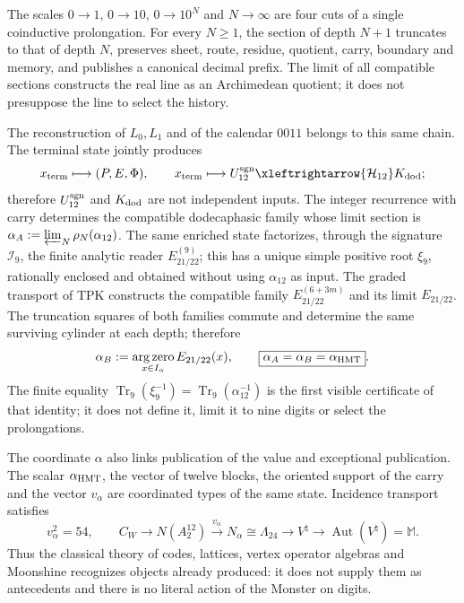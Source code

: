 \begin{theorem}
\label{thm:front-cierre-causal-simultaneo-2084}
The scales \(0\to1\), \(0\to10\), \(0\to10^N\) and
\(N\to\infty\) are four cuts of a single coinductive prolongation.
For every \(N\geq1\), the section of depth \(N+1\) truncates to that of
depth \(N\), preserves sheet, route, residue, quotient, carry, boundary
and memory, and publishes a canonical decimal prefix. The limit of all
compatible sections constructs the real line as an Archimedean quotient;
it does not presuppose the line to select the history.

The reconstruction of \(L_0,L_1\) and of the calendar \(0011\) belongs to
this same chain. The terminal state jointly produces
\[
 x_{\rm term}\longmapsto(P,E,\Phi),
 \qquad
 x_{\rm term}\longmapsto U_{12}^{\rm sgn}
 \xleftrightarrow{\mathcal H_{12}}K_{\rm dod};
\]
therefore \(U_{12}^{\rm sgn}\) and \(K_{\rm dod}\) are not independent
inputs. The integer recurrence with carry determines the compatible
dodecaphasic family whose limit section is
\(\alpha_A:=\varprojlim_N\rho_N(\alpha_{12})\). The same enriched state
factorizes, through the signature \(\mathcal I_9\), the finite analytic reader
\(E_{21/22}^{(9)}\); this has a unique simple positive root \(\xi_9\),
rationally enclosed and obtained without using \(\alpha_{12}\) as input. The
graded transport of TPK constructs the compatible family
\(E_{21/22}^{(6+3m)}\) and its limit \(E_{21/22}\). The truncation squares
of both families commute and determine the same surviving cylinder at each depth;
therefore
\[
 \alpha_B:=\operatorname*{arg\,zero}_{x\in I_\alpha}E_{21/22}(x),
 \qquad
 \boxed{\alpha_A=\alpha_B=\alpha_{\rm HMT}}.
\]
The finite equality
\(\operatorname{Tr}_9(\xi_9^{-1})=
\operatorname{Tr}_9(\alpha_{12}^{-1})\) is the first visible certificate of
that identity; it does not define it, limit it to nine digits or select the
prolongations.

The coordinate \(\alpha\) also links publication of the value and
exceptional publication. The scalar \(\alpha_{\rm HMT}\), the vector of
twelve blocks, the oriented support of the carry and the vector
\(v_\alpha\) are coordinated types of the same state. Incidence
transport satisfies
\[
 v_\alpha^2=54,
 \qquad
 C_W\longrightarrow N(A_2^{12})
 \xrightarrow{\,v_\alpha\,}N_\alpha\cong\Lambda_{24}
 \longrightarrow V^\natural
 \longrightarrow\operatorname{Aut}(V^\natural)=\mathbb M.
\]
Thus the classical theory of codes, lattices, vertex operator
algebras and Moonshine recognizes objects already produced: it does not supply them as
antecedents and there is no literal action of the Monster on digits.


\end{theorem}
